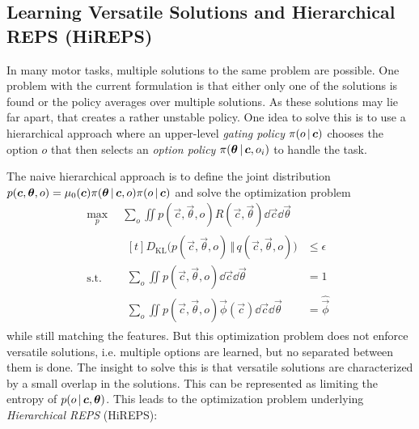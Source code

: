 		\subsection{Learning Versatile Solutions and Hierarchical REPS (HiREPS)}
			In many motor tasks, multiple solutions to the same problem are possible. One problem with the current formulation is that either only one of the solutions is found or the policy averages over multiple solutions. As these solutions may lie far apart, that creates a rather unstable policy. One idea to solve this is to use a hierarchical approach where an upper-level \emph{gating policy} \( \pi(o \,\vert\, \bm{c}) \) chooses the option \(o\) that then selects an \emph{option policy} \( \pi(\bm{\theta} \,\vert\, \bm{c}, o_i) \) to handle the task.

			The naive hierarchical approach is to define the joint distribution \( p(\bm{c}, \bm{\theta}, o) = \mu_0(\bm{c}) \pi(\bm{\theta} \,\vert\, \bm{c}, o) \pi(o \,\vert\, \bm{c}) \) and solve the optimization problem
			\begin{equation*}
				\begin{aligned}
					\max_p \,           & \sum_o \iint\! p(\vec{c}, \vec{\theta}, o) R(\vec{c}, \vec{\theta}) \dd{\vec{c}} \dd{\vec{\theta}} \\
					\mathrm{s.t.} \quad &
					\begin{aligned}[t]
						D_\mathrm{KL}\big( p(\vec{c}, \vec{\theta}, o) \,\Vert\, q(\vec{c}, \vec{\theta}, o) \big)    & \leq \epsilon      \\
						\sum_o \iint\! p(\vec{c}, \vec{\theta}, o) \dd{\vec{c}} \dd{\vec{\theta}}                     & = 1                \\
						\sum_o \iint\! p(\vec{c}, \vec{\theta}, o) \vec{\phi}(\vec{c}) \dd{\vec{c}} \dd{\vec{\theta}} & = \hat{\vec{\phi}}
					\end{aligned}
				\end{aligned}
			\end{equation*}
			while still matching the features. But this optimization problem does not enforce versatile solutions, i.e. multiple options are learned, but no separated between them is done. The insight to solve this is that versatile solutions are characterized by a small overlap in the solutions. This can be represented as limiting the entropy of \( p(o \,\vert\, \bm{c}, \bm{\theta}) \). This leads to the optimization problem underlying \emph{Hierarchical REPS} (HiREPS):
